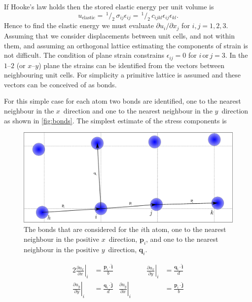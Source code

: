 If Hooke's law holds then the stored elastic energy per unit volume is
\begin{equation}
u_{\text{elastic}} =\, ^{1}\!/_{2}\, \sigma_{ij} \epsilon_{ij} =\, ^{1}\!/_{2}\, c_{ijkl} \epsilon_{ij} \epsilon_{kl}.
\end{equation}
Hence to find the elastic energy we must evaluate \({\partial u_i}/{\partial x_j}\) for $i, j = 1, 2, 3$.
Assuming that we consider displacements between unit cells, and not within them, and assuming an orthogonal lattice estimating the components of strain is not difficult. The  condition of plane strain constrains $\epsilon_{ij} = 0$ for $i\, \text{or}\, j=3$. In the $1$--$2$ (or $x$--$y$) plane the strains can be identified from the vectors between neighbouring unit cells. For simplicity a primitive lattice is assumed and these vectors can be conceived of as bonds.

For this simple case for each atom two bonds are identified, one to the nearest neighbour in the $x$~direction and one to the nearest neighbour in the $y$~direction as shown in \autoref{fig:bonds}. The simplest estimate of the  stress components is

\begin{figure}
\centering
\includegraphics[width=\textwidth]{bonds}
\caption{The bonds that are considered for the $i$th atom, one to the nearest neighbour in the positive $x$~direction, $\mathbf{p}_i$, and one to the nearest neighbour in the positive $y$~direction, $\mathbf{q}_i$.\label{fig:bonds} }
\end{figure}




\begin{alignat}{2}\label{eqn:estimate_strains}
\left. \frac{\partial u_x}{\partial x}\right|_i &= \frac{\mathbf{p}_i \cdot \mathbf{\hat{i}}}{b} &\qquad\qquad
\left. \frac{\partial u_x}{\partial y}\right|_i &= \frac{\mathbf{q}_i \cdot \mathbf{\hat{i}}}{d} \nonumber\\
\left. \frac{\partial u_y}{\partial y}\right|_i &= \frac{\mathbf{q}_i \cdot \mathbf{\hat{j}}}{d} &
\left. \frac{\partial u_y}{\partial x}\right|_i &= \frac{\mathbf{p}_i \cdot \mathbf{\hat{j}}}{b}
\end{alignat}



